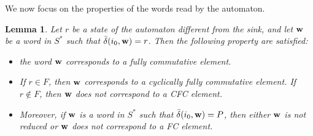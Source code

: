 \documentclass[reqno,12pt]{amsart}
\newtheorem{lemma}[Theorem]{Lemma}
\theoremstyle{definition}
\begin{document}
We now focus on the properties of the words read by the automaton.

\begin{lemma}\label{lemme2}
Let  $r$ be a state of the automaton different from the sink, and let ${\bf w}$ be a word in $S^*$ such that $\bar{\delta}(i_0,{\bf w})=r$. Then the following property are satisfied:

\begin{itemize}

\item[($vi$)] the word ${\bf w}$ corresponds to a fully commutative element.



\item[($vii$)] If $r \in F$, then ${\bf w}$ corresponds to a cyclically fully commutative element. If $r \notin F$, then ${\bf w}$ does not correspond to a CFC element.
\item[($viii$)] Moreover, if ${\bf w}$ is a word in $S^*$ such that $\bar{\delta}(i_0,{\bf w})=P$, then either  ${\bf w}$ is not reduced or ${\bf w}$ does not correspond to a FC element.



\end{itemize}
\end{lemma}
\end{document}
